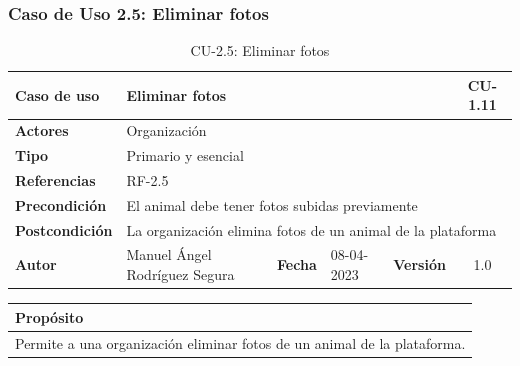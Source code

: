\subsubsection{Caso de Uso 2.5: Eliminar fotos}\label{subsubsec:eliminar-fotos-animal}

\begin{table}[H]
    \begin{center}
        \begin{adjustbox}{width=\textwidth}
            \begin{tabular}{ | l | l | l | l | c | c | }
                \hline
                \textbf{Caso de uso} & \multicolumn{4}{l|}{Eliminar fotos} & \cellcolor{gray!50} \textbf{CU-1.11}\\
                \hline
                \textbf{Actores} & \multicolumn{5}{p{0.5\linewidth}|}{Organización} \\
                \hline
                \textbf{Tipo} & \multicolumn{5}{l|}{Primario y esencial} \\
                \hline
                \textbf{Referencias} & \multicolumn{3}{l|}{RF-2.5} & \multicolumn{2}{l|}{ }\\
                \hline
                \textbf{Precondición} & \multicolumn{5}{l|}{El animal debe tener fotos subidas previamente} \\
                \hline
                \textbf{Postcondición} & \multicolumn{5}{l|}{La organización elimina fotos de un animal de la plataforma} \\
                \hline
                \textbf{Autor} & \multicolumn{1}{p{0.25\linewidth}|}{Manuel Ángel Rodríguez Segura} & \textbf{Fecha} &
                08-04-2023     & \textbf{Versión}                                                      & 1.0\\
                \hline
            \end{tabular}
        \end{adjustbox}
        \caption{CU-2.5: Eliminar fotos}
        \label{tab:eliminar-fotos}
    \end{center}
\end{table}

\begin{table}[H]
    \centering
    \begin{tabularx}{\textwidth}{@{} |L |@{}} \hline
        \textbf{Propósito} \\
        \hline
        Permite a una organización eliminar fotos de un animal de la plataforma. \\
        \hline
    \end{tabularx}
\end{table}

